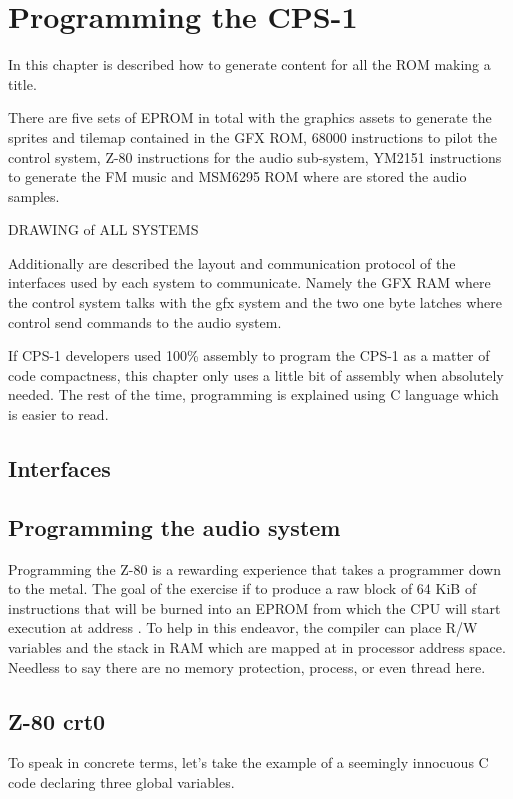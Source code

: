 \chapter{Programming the CPS-1}

In this chapter is described how to generate content for all the ROM making a title. 

There are five sets of EPROM in total with the graphics assets to generate the sprites and tilemap contained in the GFX ROM, 68000 instructions to pilot the control system, Z-80 instructions for the audio sub-system, YM2151 instructions to generate the FM music and MSM6295 ROM where are stored the audio samples.

DRAWING of ALL SYSTEMS

Additionally are described the layout and communication protocol of the interfaces used by each system to communicate. Namely the GFX RAM where the control system talks with the gfx system and the two one byte latches where control send commands to the audio system.

If CPS-1 developers used 100\% assembly to program the CPS-1 as a matter of code compactness, this chapter only uses a little bit of assembly when absolutely needed. The rest of the time, programming is explained using C language which is easier to read.



\section{Interfaces}

\section{Programming the audio system}
Programming the Z-80 is a rewarding experience that takes a programmer down to the metal. The goal of the exercise if to produce a raw block of 64 KiB of instructions that will be burned into an EPROM from which the CPU will start execution at address . To help in this endeavor, the compiler can place R/W variables and the stack in RAM which are mapped at  in processor address space. Needless to say there are no memory protection, process, or even thread here.


\section{Z-80 crt0}
To speak in concrete terms, let's take the example of a seemingly innocuous C code declaring three global variables.

